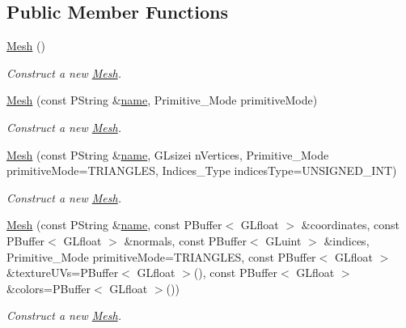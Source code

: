 \subsection*{Public Member Functions}
\begin{DoxyCompactItemize}
\item 
\mbox{\hyperlink{classprz_1_1_mesh_a44ad0bce328a1dff4e02c394bb77566d}{Mesh}} ()
\begin{DoxyCompactList}\small\item\em Construct a new \mbox{\hyperlink{classprz_1_1_mesh}{Mesh}}. \end{DoxyCompactList}\item 
\mbox{\hyperlink{classprz_1_1_mesh_affbffa087c8ba58116135a94e043a22b}{Mesh}} (const P\+String \&\mbox{\hyperlink{classprz_1_1_mesh_ae2a7cec3a1cb7409ea2017cd729fe683}{name}}, Primitive\+\_\+\+Mode primitive\+Mode)
\begin{DoxyCompactList}\small\item\em Construct a new \mbox{\hyperlink{classprz_1_1_mesh}{Mesh}}. \end{DoxyCompactList}\item 
\mbox{\hyperlink{classprz_1_1_mesh_a60ab064062ab3206f247207ddd41a176}{Mesh}} (const P\+String \&\mbox{\hyperlink{classprz_1_1_mesh_ae2a7cec3a1cb7409ea2017cd729fe683}{name}}, G\+Lsizei n\+Vertices, Primitive\+\_\+\+Mode primitive\+Mode=T\+R\+I\+A\+N\+G\+L\+ES, Indices\+\_\+\+Type indices\+Type=U\+N\+S\+I\+G\+N\+E\+D\+\_\+\+I\+NT)
\begin{DoxyCompactList}\small\item\em Construct a new \mbox{\hyperlink{classprz_1_1_mesh}{Mesh}}. \end{DoxyCompactList}\item 
\mbox{\hyperlink{classprz_1_1_mesh_a4433113df2e40cf204bdfe8c9b629ce2}{Mesh}} (const P\+String \&\mbox{\hyperlink{classprz_1_1_mesh_ae2a7cec3a1cb7409ea2017cd729fe683}{name}}, const P\+Buffer$<$ G\+Lfloat $>$ \&coordinates, const P\+Buffer$<$ G\+Lfloat $>$ \&normals, const P\+Buffer$<$ G\+Luint $>$ \&indices, Primitive\+\_\+\+Mode primitive\+Mode=T\+R\+I\+A\+N\+G\+L\+ES, const P\+Buffer$<$ G\+Lfloat $>$ \&texture\+U\+Vs=P\+Buffer$<$ G\+Lfloat $>$(), const P\+Buffer$<$ G\+Lfloat $>$ \&colors=P\+Buffer$<$ G\+Lfloat $>$())
\begin{DoxyCompactList}\small\item\em Construct a new \mbox{\hyperlink{classprz_1_1_mesh}{Mesh}}. \end{DoxyCompactList}\item 

\end{DoxyCompactItemize}

